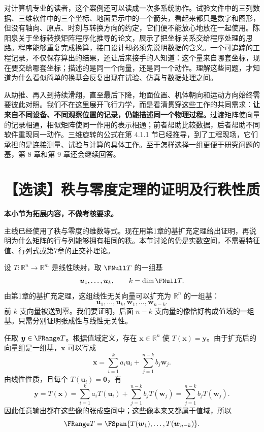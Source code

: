 \documentclass[a4paper,12pt,twoside,openany,fontset=none]{ctexbook}
\let\oldsum\sum
\renewcommand{\sum}{\displaystyle\oldsum}
\numberwithin{equation}{chapter}
\begin{document}
对计算机专业的读者，这个案例还可以读成一次多系统协作。试验文件中的三列数据、三维软件中的三个坐标、地面显示中的一个箭头，看起来都只是数字和图形，但没有轴向、原点、时刻与转换方向的约定，它们便不能放心地放在一起使用。陈阳泉关于坐标转换矩阵程序化推导的论文，展示了把坐标关系交给程序处理的思路。\cite{chen-coordinate-matrix-1989}程序能够重复完成换算，接口设计却必须先说明数据的含义。一个可追踪的工程记录，不仅保存算出的结果，还让后来接手的人知道：这个量来自哪套坐标，现在要交给哪套坐标；描述的是同一个向量，还是同一个动作。理解这些问题，才知道为什么看似简单的换基会反复出现在试验、仿真与数据处理之间。

从助推、再入到持续滑翔，直至最后下降，地面位置、机体朝向和运动方向始终需要彼此对照。我们不在这里展开飞行力学，而是看清贯穿这些工作的共同需求：\textbf{让来自不同设备、不同观察位置的记录，仍能描述同一个物理过程。}过渡矩阵使向量的记录相通，相似矩阵使同一作用的表示相通；前者帮助比较数据，后者帮助不同软件重现同一动作。三维旋转的公式在第 4.1.1 节已经推导，到了工程现场，它们承担的是连接测量、试验与计算的具体工作。至于怎样选择一组更便于研究问题的基，第 8 章和第 9 章还会继续回答。

\section{【选读】秩与零度定理的证明及行秩性质}
\label{sec:four-proof}
\textbf{本小节为拓展内容，不做考核要求。}

主线已经使用了秩与零度的维数等式。现在用第1章的基扩充定理给出证明，再说明为什么矩阵的行与列能够拥有相同的秩。本节讨论的仍是实数空间，不需要特征值、行列式或第7章的正交补理论。

设 $T:\mathbb R^n\to\mathbb R^m$ 是线性映射，取 $\FNull T$ 的一组基
\[
 \boldsymbol u_1,\ldots,\boldsymbol u_k,\qquad k=\dim\FNull T.
\]
由第1章的基扩充定理，这组线性无关向量可以扩充为 $\mathbb R^n$ 的一组基：
\[
 \boldsymbol u_1,\ldots,\boldsymbol u_k,
 \boldsymbol w_1,\ldots,\boldsymbol w_{n-k}.
\]
前 $k$ 支向量被送到零。我们要证明，后面 $n-k$ 支向量的像恰好构成值域的一组基。只需分别证明张成性与线性无关性。

任取 $\boldsymbol y\in\FRange T$。根据值域定义，存在 $\boldsymbol x\in\mathbb R^n$ 使 $T(\boldsymbol x)=\boldsymbol y$。由于扩充后的向量组是一组基，$\boldsymbol x$ 可以写成
\[
 \boldsymbol x=\sum_{i=1}^k a_i\boldsymbol u_i+
 \sum_{j=1}^{n-k}b_j\boldsymbol w_j.
\]
由线性性质，且每个 $T(\boldsymbol u_i)=\boldsymbol0$，有
\[
 \boldsymbol y=T(\boldsymbol x)
 =\sum_{i=1}^k a_iT(\boldsymbol u_i)+\sum_{j=1}^{n-k}b_jT(\boldsymbol w_j)
 =\sum_{j=1}^{n-k}b_jT(\boldsymbol w_j).
\]
因此任意输出都在这些像的张成空间中；这些像本来又都属于值域，所以
\[
 \FRange T=\FSpan\{T(\boldsymbol w_1),\ldots,T(\boldsymbol w_{n-k})\}.
\]
\end{document}
